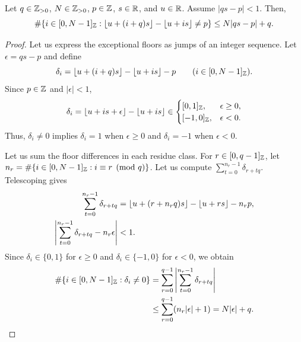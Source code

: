 \begin{lemma}\label{lem:floor-discrepancies}
Let $q\in\mathbb Z_{>0}$, $N\in\mathbb Z_{>0}$, $p\in\mathbb Z$, $s\in\mathbb R$, and $u\in\mathbb R$.
Assume $|qs-p|<1$.
Then,
\[
 \#\{i\in[0,N-1]_{\mathbb Z}:\left\lfloor u+(i+q)s\right\rfloor-\left\lfloor u+is\right\rfloor\ne p\}
 \le N|qs-p|+q.
\]
\end{lemma}
\begin{proof}
Let us express the exceptional floors as jumps of an integer sequence.
Let $\epsilon=qs-p$ and define
\[
 \delta_i=\left\lfloor u+(i+q)s\right\rfloor-\left\lfloor u+is\right\rfloor-p
 \qquad(i\in[0,N-1]_{\mathbb Z}).
\]
Since $p\in\mathbb Z$ and $|\epsilon|<1$,
\[
 \delta_i=\left\lfloor u+is+\epsilon\right\rfloor-\left\lfloor u+is\right\rfloor\in
 \begin{cases}
 [0,1]_{\mathbb Z},&\epsilon\ge0,\\
 [-1,0]_{\mathbb Z},&\epsilon<0.
 \end{cases}
\]
Thus, $\delta_i\ne0$ implies $\delta_i=1$ when $\epsilon\ge0$ and $\delta_i=-1$ when $\epsilon<0$.

Let us sum the floor differences in each residue class.
For $r\in[0,q-1]_{\mathbb Z}$, let
$n_r=\#\{i\in[0,N-1]_{\mathbb Z}:i\equiv r\pmod q\}$.
Let us compute $\sum_{t=0}^{n_r-1}\delta_{r+tq}$.
Telescoping gives
\[
\begin{aligned}
 \sum_{t=0}^{n_r-1}\delta_{r+tq}
 &=\left\lfloor u+(r+n_rq)s\right\rfloor-\left\lfloor u+rs\right\rfloor-n_rp,\\
 \left|\sum_{t=0}^{n_r-1}\delta_{r+tq}-n_r\epsilon\right|&<1.
\end{aligned}
\]
Since $\delta_i\in\{0,1\}$ for $\epsilon\ge0$ and $\delta_i\in\{-1,0\}$ for $\epsilon<0$, we obtain
\[
\begin{aligned}
 \#\{i\in[0,N-1]_{\mathbb Z}:\delta_i\ne0\}
 &=\sum_{r=0}^{q-1}\left|\sum_{t=0}^{n_r-1}\delta_{r+tq}\right|\\
 &\le\sum_{r=0}^{q-1}(n_r|\epsilon|+1)=N|\epsilon|+q.
\end{aligned}
\]
\end{proof}

